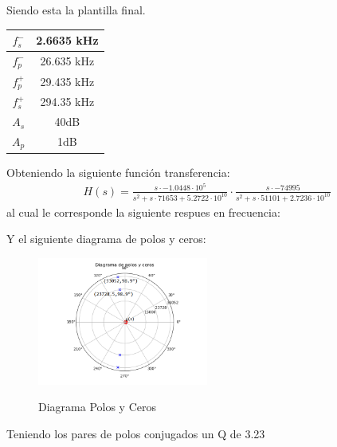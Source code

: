 Siendo esta la plantilla final.
\begin{table}[H]
\centering
\begin{tabular}{|c|c|}
\hline
$f_s^-$      & 2.6635 kHz          \\ \hline
$f_p^-$      & 26.635 kHz         \\ \hline
$f_p^+$      & 29.435 kHz           \\ \hline
$f_s^+$      & 294.35 kHz          \\ \hline
$A_s$      & 40dB           \\ \hline
$A_p$      & 1dB               \\ \hline
\end{tabular}
\end{table}
Obteniendo la siguiente función transferencia:
\begin{align}
	H(s)=\frac{s\cdot -1.0448\cdot 10^{5}}{s^2+s\cdot 71653+5.2722\cdot 10^{10}}\cdot \frac{s \cdot -74995}{s^2+s\cdot 51101+2.7236 \cdot 10^{10}}
\end{align}
al cual le corresponde la siguiente respues en frecuencia:

Y el siguiente diagrama de polos y ceros:
\begin{figure}[H]
	\centering
	\includegraphics[width=0.5\textwidth]{Imagenes-Ej2/DiagramaPolosYCeros.png}
	\label{fig:stepresponse}
	\caption{Diagrama Polos y Ceros}
\end{figure}

Teniendo los pares de polos conjugados un Q de 3.23	


